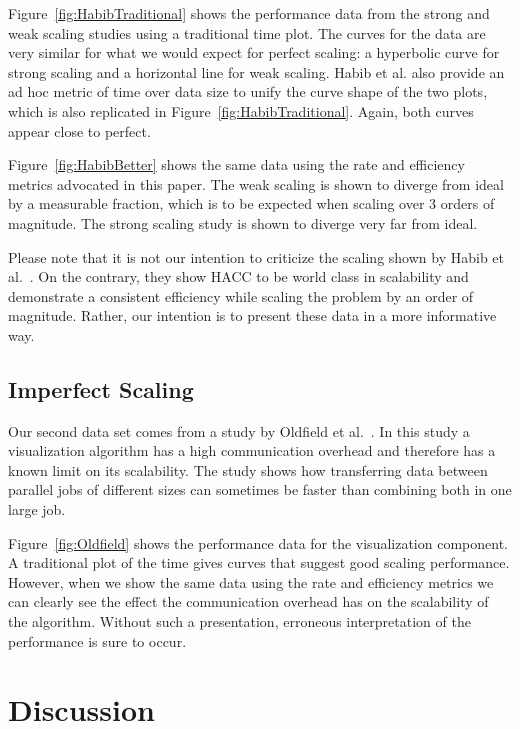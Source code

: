 \documentclass[conference]{IEEEtran}
\newcommand*{\scite}[1]{~\cite{#1}}
\newcommand{\etal}{et al.\xspace}
\begin{document}
Figure~\ref{fig:HabibTraditional} shows the performance data from the
strong and weak scaling studies using a traditional time plot. The curves
for the data are very similar for what we would expect for perfect scaling:
a hyperbolic curve for strong scaling and a horizontal line for weak
scaling. Habib \etal also provide an ad hoc metric of time over data size
to unify the curve shape of the two plots, which is also replicated in
Figure~\ref{fig:HabibTraditional}. Again, both curves appear close to
perfect.

Figure~\ref{fig:HabibBetter} shows the same data using the rate and
efficiency metrics advocated in this paper. The weak scaling is shown to
diverge from ideal by a measurable fraction, which is to be expected when
scaling over 3 orders of magnitude. The strong scaling study is shown to
diverge very far from ideal.

Please note that it is not our intention to criticize the scaling shown by
Habib \etal\scite{Habib2013}. On the contrary, they show HACC to be world
class in scalability and demonstrate a consistent efficiency while scaling
the problem by an order of magnitude. Rather, our intention is to present
these data in a more informative way.

\subsection{Imperfect Scaling}

\noindent
Our second data set comes from a study by Oldfield
\etal\scite{Oldfield2014,Rogers2013}. In this study a visualization
algorithm has a high communication overhead and therefore has a known limit
on its scalability. The study shows how transferring data between parallel
jobs of different sizes can sometimes be faster than combining both in one
large job.

Figure~\ref{fig:Oldfield} shows the performance data for the visualization
component. A traditional plot of the time gives curves that suggest good
scaling performance. However, when we show the same data using the rate and
efficiency metrics we can clearly see the effect the communication overhead
has on the scalability of the algorithm. Without such a presentation,
erroneous interpretation of the performance is sure to occur.

\section{Discussion}
\end{document}
